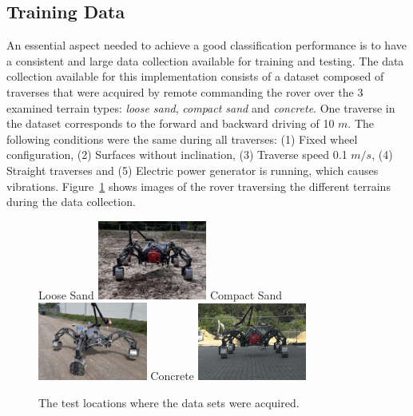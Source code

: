 \documentclass{article}
\begin{document}
\subsection{Training Data}

An essential aspect needed to achieve a good classification performance is to have a consistent and large data collection available for training and testing. 
The data collection available for this implementation consists of a dataset composed of traverses that were acquired by remote commanding the rover over the 3 examined terrain types: \emph{loose sand}, \emph{compact sand} and \emph{concrete}. 
One traverse in the dataset corresponds to the forward and backward driving of 10 $m$. 
The following conditions were the same during all traverses: (1) Fixed wheel configuration, (2) Surfaces without inclination, (3) Traverse speed 0.1 $m/s$, (4) Straight traverses and (5) Electric power generator is running, which causes vibrations.
Figure~\ref{fig:TestLocs} shows images of the rover traversing the different terrains during the data collection.


\begin{figure}[!htb]
   \centering
    \subcaptionbox
        {Loose Sand}
        {\includegraphics[width=0.32\textwidth]{../figures/unprepsand.png}}
    \subcaptionbox
        {Compact Sand}
        {\includegraphics[width=0.32\textwidth]{../figures/compact.png}}
    \subcaptionbox
        {Concrete}
        {\includegraphics[width=0.32\textwidth]{../figures/concrete_v2.png}}
    \caption{The test locations where the data sets were acquired.}
    \label{fig:TestLocs}
\end{figure}
\end{document}
